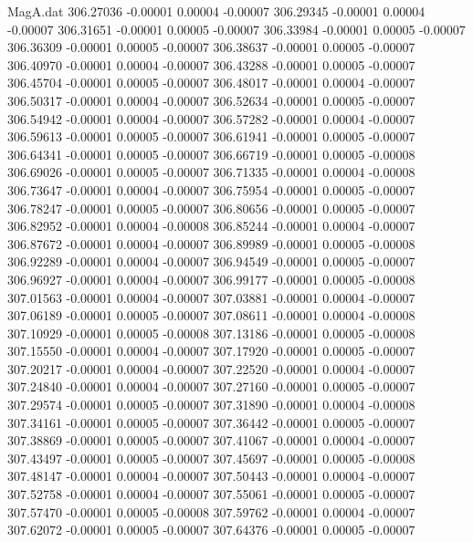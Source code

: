 \begin{filecontents}{MagA.dat}
 306.27036   -0.00001    0.00004   -0.00007
 306.29345   -0.00001    0.00004   -0.00007
 306.31651   -0.00001    0.00005   -0.00007
 306.33984   -0.00001    0.00005   -0.00007
 306.36309   -0.00001    0.00005   -0.00007
 306.38637   -0.00001    0.00005   -0.00007
 306.40970   -0.00001    0.00004   -0.00007
 306.43288   -0.00001    0.00005   -0.00007
 306.45704   -0.00001    0.00005   -0.00007
 306.48017   -0.00001    0.00004   -0.00007
 306.50317   -0.00001    0.00004   -0.00007
 306.52634   -0.00001    0.00005   -0.00007
 306.54942   -0.00001    0.00004   -0.00007
 306.57282   -0.00001    0.00004   -0.00007
 306.59613   -0.00001    0.00005   -0.00007
 306.61941   -0.00001    0.00005   -0.00007
 306.64341   -0.00001    0.00005   -0.00007
 306.66719   -0.00001    0.00005   -0.00008
 306.69026   -0.00001    0.00005   -0.00007
 306.71335   -0.00001    0.00004   -0.00008
 306.73647   -0.00001    0.00004   -0.00007
 306.75954   -0.00001    0.00005   -0.00007
 306.78247   -0.00001    0.00005   -0.00007
 306.80656   -0.00001    0.00005   -0.00007
 306.82952   -0.00001    0.00004   -0.00008
 306.85244   -0.00001    0.00004   -0.00007
 306.87672   -0.00001    0.00004   -0.00007
 306.89989   -0.00001    0.00005   -0.00008
 306.92289   -0.00001    0.00004   -0.00007
 306.94549   -0.00001    0.00005   -0.00007
 306.96927   -0.00001    0.00004   -0.00007
 306.99177   -0.00001    0.00005   -0.00008
 307.01563   -0.00001    0.00004   -0.00007
 307.03881   -0.00001    0.00004   -0.00007
 307.06189   -0.00001    0.00005   -0.00007
 307.08611   -0.00001    0.00004   -0.00008
 307.10929   -0.00001    0.00005   -0.00008
 307.13186   -0.00001    0.00005   -0.00008
 307.15550   -0.00001    0.00004   -0.00007
 307.17920   -0.00001    0.00005   -0.00007
 307.20217   -0.00001    0.00004   -0.00007
 307.22520   -0.00001    0.00004   -0.00007
 307.24840   -0.00001    0.00004   -0.00007
 307.27160   -0.00001    0.00005   -0.00007
 307.29574   -0.00001    0.00005   -0.00007
 307.31890   -0.00001    0.00004   -0.00008
 307.34161   -0.00001    0.00005   -0.00007
 307.36442   -0.00001    0.00005   -0.00007
 307.38869   -0.00001    0.00005   -0.00007
 307.41067   -0.00001    0.00004   -0.00007
 307.43497   -0.00001    0.00005   -0.00007
 307.45697   -0.00001    0.00005   -0.00008
 307.48147   -0.00001    0.00004   -0.00007
 307.50443   -0.00001    0.00004   -0.00007
 307.52758   -0.00001    0.00004   -0.00007
 307.55061   -0.00001    0.00005   -0.00007
 307.57470   -0.00001    0.00005   -0.00008
 307.59762   -0.00001    0.00004   -0.00007
 307.62072   -0.00001    0.00005   -0.00007
 307.64376   -0.00001    0.00005   -0.00007

\end{filecontents}

